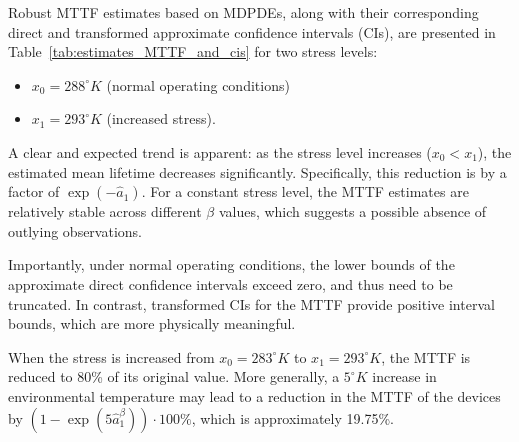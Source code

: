 \documentclass{article}
\begin{document}
Robust MTTF estimates based on MDPDEs, along with their corresponding direct and transformed approximate confidence intervals (CIs), are presented in Table~\ref{tab:estimates_MTTF_and_cis} for two stress levels:
\begin{itemize}
    \item $x_0=288^ \circ K$ (normal operating conditions)
    \item $x_1=293^ \circ K$ (increased stress).
\end{itemize}
A clear and expected trend is apparent: as the stress level increases ($x_0 < x_1 $), the estimated mean lifetime decreases significantly. Specifically, this reduction is by a factor of $\exp\left(-\hat{a}_1\right)$. For a constant stress level, the MTTF estimates are relatively stable across different $\beta$ values, which suggests a possible absence of outlying observations.

Importantly, under normal operating conditions, the lower bounds of the approximate direct confidence intervals exceed zero, and thus need to be truncated. In contrast, transformed CIs for the MTTF provide positive interval bounds, which are more physically meaningful.

When the stress is increased from $x_0=283^\circ K$ to $x_1=293^\circ K$, the MTTF is reduced to 80\% of its original value. More generally, a $5^\circ K$ increase in environmental temperature may lead to a reduction in the MTTF of the devices by $\left(1-\exp\left(5\widehat{a}_1^\beta \right)\right) \cdot 100\%$, which is approximately 19.75\%.
\end{document}
